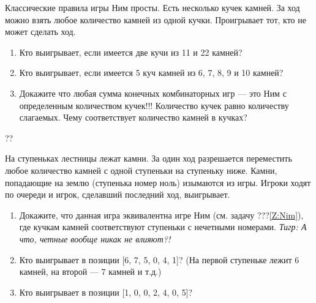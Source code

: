 \begin{problem}\label{Z:Nim}

Классические правила игры Ним просты. Есть несколько кучек камней. За ход можно взять любое количество камней из одной кучки. Проигрывает тот, кто не может сделать ход.\par
\begin{enumerate}
\item 	Кто выигрывает, если имеется две кучи из 11 и 22 камней?\par
\item 	Кто выигрывает, если имеется 5 куч камней из 6, 7, 8, 9 и 10 камней?\par
\item 	Докажите что любая сумма конечных комбинаторных игр — это Ним с определенным количеством кучек!!! Количество кучек равно количеству слагаемых. Чему соответствует количество камней в кучках?
\end{enumerate}



\begin{sol}

\end{sol}
\end{problem}



\begin{problem}\par
\begin{source} \cite{sprague:uz}??\end{source}
На ступеньках лестницы лежат камни. За один ход разрешается переместить любое количество камней с одной ступеньки на ступеньку ниже. Камни, попадающие на землю (ступенька номер ноль) изымаются из игры. Игроки ходят по очереди и игрок, сделавший последний ход, выигрывает.\par
\begin{enumerate}
\item 	Докажите, что данная игра эквивалентна игре Ним (см. задачу  {\red ???}\ref{Z:Nim}), где кучкам камней соответствуют ступеньки с нечетными номерами. {\it Тигр: А что, четные вообще никак не влияют?!}\par
\item 	Кто выигрывает в позиции [6, 7, 5, 0, 4, 1]? (На первой ступеньке лежит 6 камней, на второй — 7 камней и т.д.)\par
\item 	Кто выигрывает в позиции [1, 0, 0, 2, 4, 0, 5]?\par
\end{enumerate}


\begin{sol}

\end{sol}
\end{problem}

